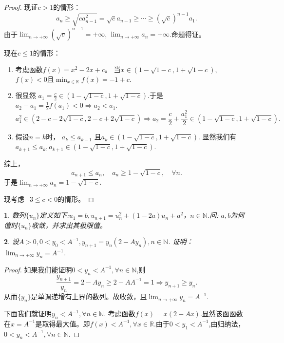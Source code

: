 \documentclass[utf8]{book}
\newtheorem{example}{}[section]             %
\begin{document}
\begin{proof}
现证$c>1$的情形：
$$a_{n} \geq \sqrt{ca_{n-1}^2} = \sqrt{c}a_{n-1} \geq \cdots \geq \left(\sqrt{c}\right)^{n-1}a_1.$$
由于$\displaystyle\lim_{n\to +\infty}\left(\sqrt{c}\right)^{n-1} = +\infty$, $\displaystyle\lim_{n\to +\infty}a_{n} = +\infty$.命题得证。

现在$c\leq 1$的情形：
\renewcommand\labelenumi{\normalfont(\theenumi)}
\begin{enumerate}
\item 考虑函数$f(x) = x^2-2x+c$。 当$x\in (1-\sqrt{1-c}, 1+\sqrt{1-c})$, $f(x) < 0$且$\displaystyle\min_{x\in \mathbb{R}}f(x) = -1+c$.
\item 很显然 $a_1=\frac{c}{2} \in (1-\sqrt{1-c}, 1+\sqrt{1-c})$.于是$a_2 - a_1 = \frac{1}{2}f(a_1) < 0 \Rightarrow a_2 < a_1$.
$$a^2_1\in(2-c-2\sqrt{1-c}, 2-c+2\sqrt{1-c})\Rightarrow a_2 = \frac{c}{2} + \frac{a_1^2}{2}\in (1-\sqrt{1-c}, 1+\sqrt{1-c}).$$
\item 假设$n=k$时， $a_k \leq a_{k-1}$ 且$a_k\in (1-\sqrt{1-c}, 1+\sqrt{1-c})$. 显然我们有$a_{k+1} \leq a_k, a_{k+1}\in (1-\sqrt{1-c}, 1+\sqrt{1-c})$.
\end{enumerate}
综上，
$$a_{n+1}\leq a_{n}, \quad a_n\geq 1-\sqrt{1-c}, \quad\forall n.$$
于是$\displaystyle\lim_{n\to +\infty}a_{n}=1-\sqrt{1-c}$.

现考虑$-3\leq c < 0$的情形。

\end{proof}
\begin{example}
数列$\{u_n\}$定义如下:$u_1=b,u_{n+1}=u_n^2+(1-2a)u_n+a^2$，$n\in\mathbb{N}$.问: $a,b$为何值时$\{u_n\}$收敛，并求出其极限值。
\end{example}
\begin{example}
设$A > 0, 0< y_0 < A^{-1}, y_{n+1} = y_n(2-Ay_n), n\in\mathbb{N}$. 证明：$\displaystyle\lim_{n\to +\infty}y_{n}=A^{-1}$.
\end{example}
\begin{proof}如果我们能证明$0< y_n < A^{-1}, \forall n\in\mathbb{N}$,则
$$\frac{y_{n+1}}{y_n} = 2-Ay_n\geq 2-AA^{-1}=1\Rightarrow y_{n+1} \geq y_n.$$
从而$\{y_n\}$是单调递增有上界的数列。故收敛，且$\displaystyle\lim_{n\to +\infty}y_{n}=A^{-1}$.

下面我们就证明$y_n < A^{-1},\forall n\in\mathbb{N}$. 考虑函数$f(x)=x(2-Ax)$.显然该函函数在$x=A^{-1}$是取得最大值。即$f(x) < A^{-1},\forall x\in \mathbb{R}$.由于$0< y_1 < A^{-1}$,由归纳法， $0< y_n < A^{-1}, \forall n\in\mathbb{N}$.
\end{proof}
\end{document}
